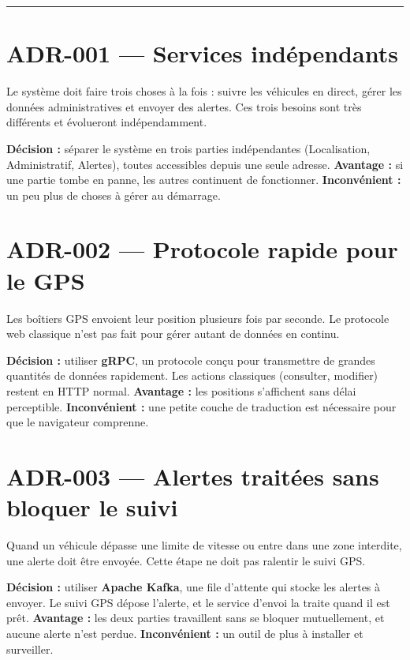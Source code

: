 \documentclass[10pt,a4paper]{article}
\newcommand{\ruledline}{\textcolor{rule}{\rule{\linewidth}{0.4pt}}\vspace{4pt}}
\begin{document}
\vspace{6pt}
\ruledline


\section{ADR-001 — Services indépendants}

Le système doit faire trois choses à la fois : suivre les véhicules en direct, gérer les données administratives et envoyer des alertes. Ces trois besoins sont très différents et évolueront indépendamment.

\textbf{Décision :} séparer le système en trois parties indépendantes (Localisation, Administratif, Alertes), toutes accessibles depuis une seule adresse. \textbf{Avantage :} si une partie tombe en panne, les autres continuent de fonctionner. \textbf{Inconvénient :} un peu plus de choses à gérer au démarrage.



\section{ADR-002 — Protocole rapide pour le GPS}

Les boîtiers GPS envoient leur position plusieurs fois par seconde. Le protocole web classique n'est pas fait pour gérer autant de données en continu.

\textbf{Décision :} utiliser \textbf{gRPC}, un protocole conçu pour transmettre de grandes quantités de données rapidement. Les actions classiques (consulter, modifier) restent en HTTP normal. \textbf{Avantage :} les positions s'affichent sans délai perceptible. \textbf{Inconvénient :} une petite couche de traduction est nécessaire pour que le navigateur comprenne.



\section{ADR-003 — Alertes traitées sans bloquer le suivi}

Quand un véhicule dépasse une limite de vitesse ou entre dans une zone interdite, une alerte doit être envoyée. Cette étape ne doit pas ralentir le suivi GPS.

\textbf{Décision :} utiliser \textbf{Apache Kafka}, une file d'attente qui stocke les alertes à envoyer. Le suivi GPS dépose l'alerte, et le service d'envoi la traite quand il est prêt. \textbf{Avantage :} les deux parties travaillent sans se bloquer mutuellement, et aucune alerte n'est perdue. \textbf{Inconvénient :} un outil de plus à installer et surveiller.
\end{document}
